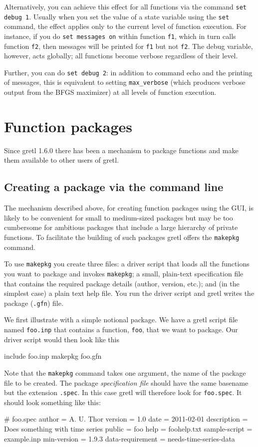 Alternatively, you can achieve this effect for all functions via
the command \texttt{set debug 1}.  Usually when you set the value of a
state variable using the \texttt{set} command, the effect applies only
to the current level of function execution.  For instance, if you do
\texttt{set messages on} within function \texttt{f1}, which in turn
calls function \texttt{f2}, then messages will be printed for
\texttt{f1} but not \texttt{f2}.  The debug variable, however, acts
globally; all functions become verbose regardless of their level.

Further, you can do \texttt{set debug 2}: in addition to command echo
and the printing of messages, this is equivalent to setting
\verb|max_verbose| (which produces verbose output from the BFGS
maximizer) at all levels of function execution.

\section{Function packages}
\label{sec:func-packages}

Since gretl 1.6.0 there has been a mechanism to package
functions and make them available to other users of gretl.  

\subsection{Creating a package via the command line}

The mechanism described above, for creating function packages using
the GUI, is likely to be convenient for small to medium-sized packages
but may be too cumbersome for ambitious packages that include a large
hierarchy of private functions. To facilitate the building of such
packages gretl offers the \texttt{makepkg} command.

To use \texttt{makepkg} you create three files: a driver script that
loads all the functions you want to package and invokes
\texttt{makepkg}; a small, plain-text specification file that contains
the required package details (author, version, etc.); and (in the
simplest case) a plain text help file.  You run the driver script and
gretl writes the package (\texttt{.gfn}) file.

We first illustrate with a simple notional package. We have a gretl
script file named \texttt{foo.inp} that contains a function,
\texttt{foo}, that we want to package. Our driver script would then
look like this
%
\begin{code}
include foo.inp
makepkg foo.gfn
\end{code}
%
Note that the \texttt{makepkg} command takes one argument, the name of
the package file to be created. The package \emph{specification file}
should have the same basename but the extension \texttt{.spec}. In
this case gretl will therefore look for \texttt{foo.spec}. It
should look something like this:
%
\begin{code}
# foo.spec
author = A. U. Thor
version = 1.0
date = 2011-02-01
description = Does something with time series
public = foo 
help = foohelp.txt
sample-script = example.inp
min-version = 1.9.3
data-requirement = needs-time-series-data
\end{code}

